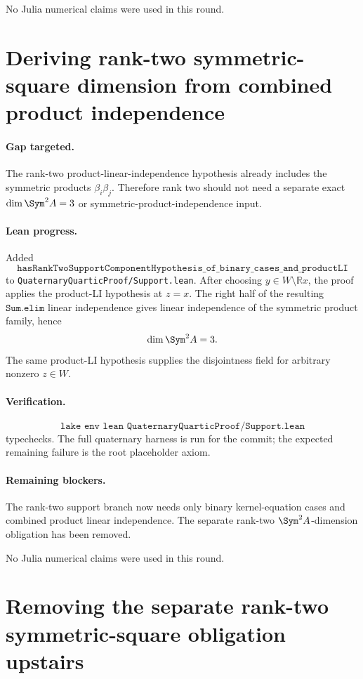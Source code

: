\documentclass[11pt]{article}
\begin{document}
No Julia numerical claims were used in this round.

\section*{Deriving rank-two symmetric-square dimension from combined product independence}

\paragraph{Gap targeted.}
The rank-two product-linear-independence hypothesis already includes the
symmetric products \(\beta_i\beta_j\).  Therefore rank two should not need a
separate exact \(\dim\Sym^2A=3\) or symmetric-product-independence input.

\paragraph{Lean progress.}
Added
\[
\texttt{hasRankTwoSupportComponentHypothesis\_of\_binary\_cases\_and\_productLI}
\]
to \texttt{QuaternaryQuarticProof/Support.lean}.  After choosing
\(y\in W\setminus\mathbb{R}x\), the proof applies the product-LI hypothesis at
\(z=x\).  The right half of the resulting \(\texttt{Sum.elim}\) linear
independence gives linear independence of the symmetric product family, hence
\[
\dim\Sym^2A=3.
\]
The same product-LI hypothesis supplies the disjointness field for arbitrary
nonzero \(z\in W\).

\paragraph{Verification.}
\[
\texttt{lake env lean QuaternaryQuarticProof/Support.lean}
\]
typechecks.  The full quaternary harness is run for the commit; the expected
remaining failure is the root placeholder axiom.

\paragraph{Remaining blockers.}
The rank-two support branch now needs only binary kernel-equation cases and
combined product linear independence.  The separate rank-two
\(\Sym^2A\)-dimension obligation has been removed.

No Julia numerical claims were used in this round.

\section*{Removing the separate rank-two symmetric-square obligation upstairs}
\end{document}
